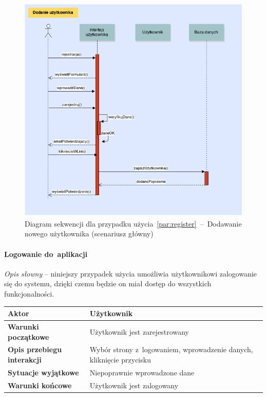 \begin{figure}[H]
  \includegraphics[width=\textwidth]{images/dodaj_uzytkownika.png}
  \caption{Diagram sekwencji dla przypadku użycia~\ref{par:register}~--~Dodawanie nowego użytkownika (scenariusz główny)}
\end{figure}

\newpage
\paragraph{Logowanie do~aplikacji\newline}
\label{par:login}

\textit{Opis słowny} -- niniejszy przypadek użycia umożliwia użytkownikowi zalogowanie się do systemu, dzięki czemu
będzie on miał dostęp do wszystkich funkcjonalności.

\begin{longtable}{|p{5cm}|p{7cm}|}
  \hline \textbf{Aktor} & Użytkownik \\ \hline
  \textbf{Warunki początkowe} & Użytkownik jest zarejestrowany \\ \hline
  \textbf{Opis przebiegu interakcji} & Wybór strony z~logowaniem, wprowadzenie danych, kliknięcie przycisku \\ \hline
  \textbf{Sytuacje wyjątkowe} & Niepoprawnie wprowadzone dane \\ \hline
  \textbf{Warunki końcowe} & Użytkownik jest zalogowany \\ \hline
\end{longtable}

